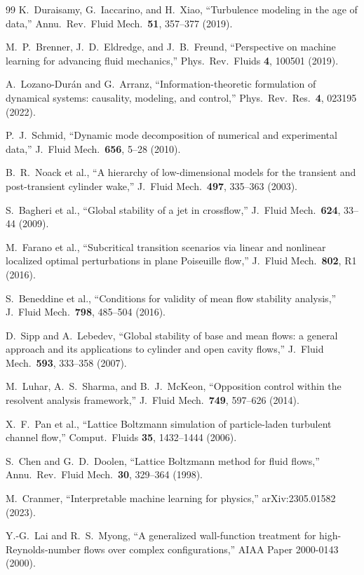 \documentclass[a4paper,11pt]{article}
\begin{document}
\begin{thebibliography}{99}
K.\ Duraisamy, G.\ Iaccarino, and H.\ Xiao,
``Turbulence modeling in the age of data,''
Annu.\ Rev.\ Fluid Mech.\ \textbf{51}, 357--377 (2019).

M.\ P.\ Brenner, J.\ D.\ Eldredge, and J.\ B.\ Freund,
``Perspective on machine learning for advancing fluid mechanics,''
Phys.\ Rev.\ Fluids \textbf{4}, 100501 (2019).

A.\ Lozano-Dur\'{a}n and G.\ Arranz,
``Information-theoretic formulation of dynamical systems: causality,
modeling, and control,''
Phys.\ Rev.\ Res.\ \textbf{4}, 023195 (2022).

P.\ J.\ Schmid,
``Dynamic mode decomposition of numerical and experimental data,''
J.\ Fluid Mech.\ \textbf{656}, 5--28 (2010).

B.\ R.\ Noack et al.,
``A hierarchy of low-dimensional models for the transient and
post-transient cylinder wake,''
J.\ Fluid Mech.\ \textbf{497}, 335--363 (2003).

S.\ Bagheri et al.,
``Global stability of a jet in crossflow,''
J.\ Fluid Mech.\ \textbf{624}, 33--44 (2009).

M.\ Farano et al.,
``Subcritical transition scenarios via linear and nonlinear localized
optimal perturbations in plane Poiseuille flow,''
J.\ Fluid Mech.\ \textbf{802}, R1 (2016).

S.\ Beneddine et al.,
``Conditions for validity of mean flow stability analysis,''
J.\ Fluid Mech.\ \textbf{798}, 485--504 (2016).

D.\ Sipp and A.\ Lebedev,
``Global stability of base and mean flows: a general approach and its
applications to cylinder and open cavity flows,''
J.\ Fluid Mech.\ \textbf{593}, 333--358 (2007).

M.\ Luhar, A.\ S.\ Sharma, and B.\ J.\ McKeon,
``Opposition control within the resolvent analysis framework,''
J.\ Fluid Mech.\ \textbf{749}, 597--626 (2014).

X.\ F.\ Pan et al.,
``Lattice Boltzmann simulation of particle-laden turbulent channel flow,''
Comput.\ Fluids \textbf{35}, 1432--1444 (2006).

S.\ Chen and G.\ D.\ Doolen,
``Lattice Boltzmann method for fluid flows,''
Annu.\ Rev.\ Fluid Mech.\ \textbf{30}, 329--364 (1998).

M.\ Cranmer,
``Interpretable machine learning for physics,''
arXiv:2305.01582 (2023).

Y.-G.\ Lai and R.\ S.\ Myong,
``A generalized wall-function treatment for high-Reynolds-number flows
over complex configurations,''
AIAA Paper 2000-0143 (2000).

\end{thebibliography}
\end{document}
